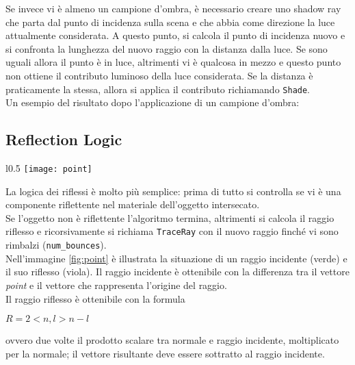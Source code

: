 Se invece vi è almeno un campione d'ombra, è necessario creare uno shadow ray 
	che parta dal punto di incidenza sulla scena e che abbia come direzione la luce attualmente considerata. A questo punto, si calcola il punto di incidenza nuovo e si confronta la lunghezza del nuovo raggio con la distanza dalla luce. Se sono uguali allora il punto è in luce, altrimenti vi è qualcosa in mezzo e questo punto non ottiene il contributo luminoso della luce considerata. Se la distanza è praticamente la stessa, allora si applica il contributo richiamando \texttt{Shade}.\\

Un esempio del risultato dopo l'applicazione di un campione d'ombra:
\begin{figure}[htb]
    \centering
    \vspace{-0.7cm}
    \vspace{-0.3cm}
\end{figure}

\subsection{Reflection Logic}
\begin{wrapfigure}{l}{0.5\textwidth} %
    \centering
    \vspace{-0.5cm}
    \texttt{[image: point]}
    
    \caption{\label{fig:point}}
\end{wrapfigure} 
    La logica dei riflessi è molto più semplice: prima di tutto si controlla se vi è una componente riflettente nel materiale dell'oggetto intersecato.\\ 
    Se l'oggetto non è riflettente l'algoritmo termina, altrimenti si calcola il raggio riflesso e ricorsivamente si richiama \texttt{TraceRay} con il nuovo raggio finché vi sono rimbalzi (\texttt{num\_bounces}).\\
    Nell'immagine \ref{fig:point} è illustrata la situazione di un raggio incidente (verde) e il suo riflesso (viola). Il raggio incidente è ottenibile con la differenza tra il vettore \textit{point} e il vettore che rappresenta l'origine del raggio.\\

Il raggio riflesso è ottenibile con la formula
\begin{center}
	$R=2<n, l> n - l$
\end{center}
ovvero due volte il prodotto scalare tra normale e raggio incidente, moltiplicato per la normale; il vettore risultante deve essere sottratto al raggio incidente.

